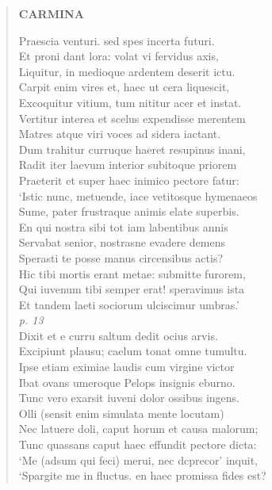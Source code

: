 \documentclass[11pt, a4paper]{report}
\begin{document}
\begin{verse}
     \marginpar{[46]} \begin{center} \textbf{CARMINA} \end{center}Praescia venturi. sed spes incerta futuri. \\ Et proni dant lora: volat vi fervidus axis, \\ Liquitur, in medioque ardentem deserit ictu. \\ Carpit enim vires et, haec ut cera liquescit, \\ Excoquitur vitium, tum nititur acer et instat. \\ Vertitur interea et scelus expendisse merentem \\ Matres atque viri voces ad sidera iactant. \\ Dum trahitur curruque haeret resupinus inani, \\ Radit iter laevum interior subitoque priorem \\ Praeterit et super haec inimico pectore fatur: \\ ‘Istic nunc, metuende, iace vetitosque hymenaeos \\ Sume, pater frustraque animis elate superbis. \\ En qui nostra sibi tot iam labentibus annis \\ Servabat senior, nostrasne evadere demens \\ Sperasti te posse manus circensibus actis? \\ Hic tibi mortis erant metae: submitte furorem, \\ Qui iuvenum tibi semper erat! speravimus ista \\ Et tandem laeti sociorum ulciscimur umbras.’ \\ \textit{p. 13} \\ Dixit et e curru saltum dedit ocius arvis. \\ Excipiunt plausu; caelum tonat omne tumultu. \\ Ipse etiam eximiae laudis cum virgine victor \\ Ibat ovans umeroque Pelops insignis eburno. \\ Tunc vero exarsit iuveni dolor ossibus ingens. \\ Olli (sensit enim simulata mente locutam) \\ Nec latuere doli, caput horum et causa malorum; \\ Tunc quassans caput haec effundit pectore dicta: \\ ‘Me (adsum qui feci) merui, nec dcprecor’ inquit, \\ ‘Spargite  \lbrack me \rbrack  in fluctus. en haec promissa fides est? \\ 

\end{verse}
\end{document}
